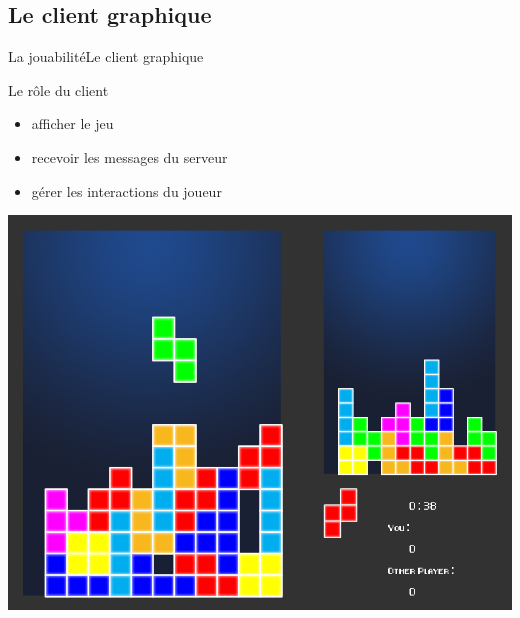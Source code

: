 \documentclass[french]{beamer}
\begin{document}
	\subsection{Le client graphique}

		\begin{frame}{La jouabilité}{Le client graphique}
			\begin{block}{Le rôle du client}
				\begin{itemize}
					\item afficher le jeu
					\item recevoir les messages du serveur
					\item gérer les interactions du joueur
				\end{itemize}
			\end{block}
			\begin{center}
				\includegraphics[scale=0.175]{img/vouitris.png}
			\end{center}
		\end{frame}
\end{document}
